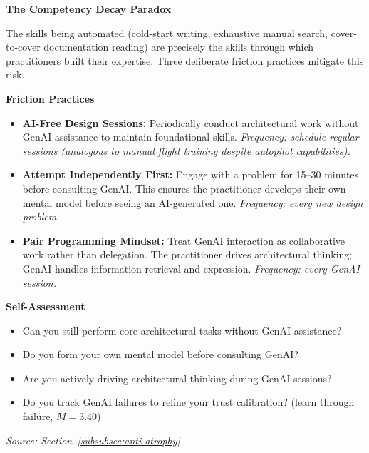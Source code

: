 \vspace{0.5em}
\textbf{The Competency Decay Paradox}

The skills being automated (cold-start writing, exhaustive manual search, cover-to-cover documentation reading) are precisely the skills through which practitioners built their expertise. Three deliberate friction practices mitigate this risk.

\vspace{0.5em}
\textbf{Friction Practices}
\begin{itemize}[label=\checkbox]
    \item \textbf{AI-Free Design Sessions:} Periodically conduct architectural work without GenAI assistance to maintain foundational skills. \textit{Frequency: schedule regular sessions (analogous to manual flight training despite autopilot capabilities).}
    \item \textbf{Attempt Independently First:} Engage with a problem for 15--30 minutes before consulting GenAI. This ensures the practitioner develops their own mental model before seeing an AI-generated one. \textit{Frequency: every new design problem.}
    \item \textbf{Pair Programming Mindset:} Treat GenAI interaction as collaborative work rather than delegation. The practitioner drives architectural thinking; GenAI handles information retrieval and expression. \textit{Frequency: every GenAI session.}
\end{itemize}

\vspace{0.5em}
\textbf{Self-Assessment}
\begin{itemize}[label=\checkbox]
    \item Can you still perform core architectural tasks without GenAI assistance?
    \item Do you form your own mental model before consulting GenAI?
    \item Are you actively driving architectural thinking during GenAI sessions?
    \item Do you track GenAI failures to refine your trust calibration? (learn through failure, $M = 3.40$)
\end{itemize}

\vspace{0.5em}
\textit{Source: Section~\ref{subsubsec:anti-atrophy}}

\clearpage
